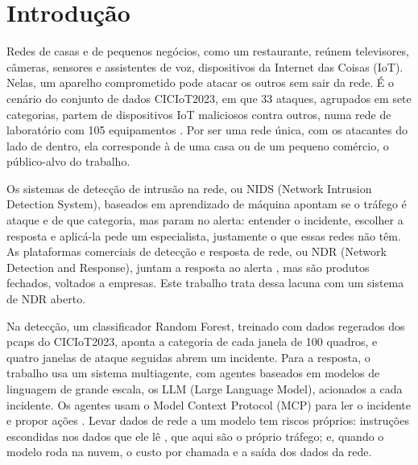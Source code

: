 \section{Introdução}
\label{sec:introducao}

Redes de casas e de pequenos negócios, como um restaurante, reúnem televisores, câmeras, sensores e assistentes de voz, dispositivos da Internet das Coisas (IoT). Nelas, um aparelho comprometido pode atacar os outros sem sair da rede. É o cenário do conjunto de dados CICIoT2023, em que 33 ataques, agrupados em sete categorias, partem de dispositivos IoT maliciosos contra outros, numa rede de laboratório com 105 equipamentos \cite{neto2023}. Por ser uma rede única, com os atacantes do lado de dentro, ela corresponde à de uma casa ou de um pequeno comércio, o público-alvo do trabalho.

Os sistemas de detecção de intrusão na rede, ou NIDS (Network Intrusion Detection System), baseados em aprendizado de máquina apontam se o tráfego é ataque e de que categoria, mas param no alerta: entender o incidente, escolher a resposta e aplicá-la pede um especialista, justamente o que essas redes não têm. As plataformas comerciais de detecção e resposta de rede, ou NDR (Network Detection and Response), juntam a resposta ao alerta \cite{darktrace2024}, mas são produtos fechados, voltados a empresas. Este trabalho trata dessa lacuna com um sistema de NDR aberto.

Na detecção, um classificador Random Forest, treinado com dados regerados dos pcaps do CICIoT2023, aponta a categoria de cada janela de 100 quadros, e quatro janelas de ataque seguidas abrem um incidente. Para a resposta, o trabalho usa um sistema multiagente, com agentes baseados em modelos de linguagem de grande escala, os LLM (Large Language Model), acionados a cada incidente. Os agentes usam o Model Context Protocol (MCP) para ler o incidente e propor ações \cite{hou2026}. Levar dados de rede a um modelo tem riscos próprios: instruções escondidas nos dados que ele lê \cite{greshake2023}, que aqui são o próprio tráfego; e, quando o modelo roda na nuvem, o custo por chamada e a saída dos dados da rede.

